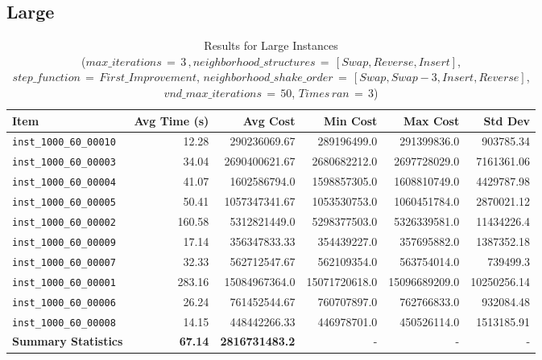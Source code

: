 \documentclass{article}
\begin{document}
\subsection*{Large}
\begin{table}[H]
	\centering
	   \caption{Results for Large Instances \\($max\_iterations \,{=}\, 3\,, neighborhood\_structures \,{=}\, [Swap, Reverse, Insert]$, $step\_function \,{=}\, First\_Improvement$, $neighborhood\_shake\_order \,{=}\, [Swap, Swap-3, Insert, Reverse]$, $vnd\_max\_iterations \,{=}\, 50$, $Times\, ran \,{=}\, 3$)}
        \hspace*{-2cm}
	\begin{tabular}{lrrrrr}
		\toprule
		\textbf{Item} & \textbf{Avg Time (s)} & \textbf{Avg Cost} & \textbf{Min Cost} & \textbf{Max Cost} & \textbf{Std Dev} \\
		\midrule
		\texttt{inst\_1000\_60\_00010} & 12.28 & 290236069.67 & 289196499.0 & 291399836.0 & 903785.34 \\ \texttt{inst\_1000\_60\_00003} & 34.04 & 2690400621.67 & 2680682212.0 & 2697728029.0 & 7161361.06 \\ \texttt{inst\_1000\_60\_00004} & 41.07 & 1602586794.0 & 1598857305.0 & 1608810749.0 & 4429787.98 \\ \texttt{inst\_1000\_60\_00005} & 50.41 & 1057347341.67 & 1053530753.0 & 1060451784.0 & 2870021.12 \\ \texttt{inst\_1000\_60\_00002} & 160.58 & 5312821449.0 & 5298377503.0 & 5326339581.0 & 11434226.4 \\ \texttt{inst\_1000\_60\_00009} & 17.14 & 356347833.33 & 354439227.0 & 357695882.0 & 1387352.18 \\ \texttt{inst\_1000\_60\_00007} & 32.33 & 562712547.67 & 562109354.0 & 563754014.0 & 739499.3 \\ \texttt{inst\_1000\_60\_00001} & 283.16 & 15084967364.0 & 15071720618.0 & 15096689209.0 & 10250256.14 \\ \texttt{inst\_1000\_60\_00006} & 26.24 & 761452544.67 & 760707897.0 & 762766833.0 & 932084.48 \\ \texttt{inst\_1000\_60\_00008} & 14.15 & 448442266.33 & 446978701.0 & 450526114.0 & 1513185.91 \\ \midrule \textbf{Summary Statistics} & \textbf{67.14} & \textbf{2816731483.2} & - & - & - \\
		\bottomrule
	\end{tabular}
	\label{tab:large_performance_metrics_gvns}
\end{table}
\end{document}
